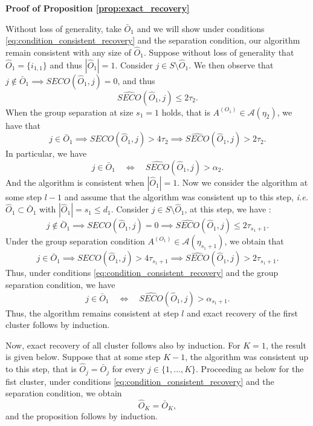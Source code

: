 \documentclass[11pt]{article}
\makeatletter
\renewenvironment{proof}[1][\proofname]{\par
\pushQED{\qed}%
\normalfont \topsep6\p@\@plus6\p@\relax
\trivlist
\item\relax
{\textbf{
#1\@addpunct{ }}}\hspace\labelsep\ignorespaces
}{%
\popQED\endtrivlist\@endpefalse
}
\makeatother
\begin{document}
	\begin{proof}[Proof of Proposition \ref{prop:exact_recovery}]
		Without loss of generality, take $\bar{O}_1$ and we will show under conditions \eqref{eq:condition_consistent_recovery} and the separation condition, our algorithm remain consistent with any size of $\hat{O}_1$. Suppose without loss of generality that $\hat{O}_1 = \{i_{1,1}\}$ and thus $|\hat{O}_1| = 1$. Consider $j \in S \setminus \hat{O}_1$. We then observe that $j \notin \bar{O}_1 \implies SECO(\hat{O}_1,j) = 0$, and thus
		\begin{equation*}
			\widehat{SECO}(\hat{O}_1,j) \leq 2 \tau_2.
		\end{equation*}
		When the group separation at size $s_1 = 1$ holds, that is $A^{(O_1)} \in \mathcal{A}(\eta_2)$, we have that 
		\begin{equation*}
			j \in \bar{O}_1 \implies SECO(\hat{O}_1, j) > 4 \tau_2 \implies \widehat{SECO}(\hat{O}_1,j) > 2 \tau_2.
		\end{equation*}
		In particular, we have
		\begin{equation*}
			j \in \bar{O}_1 \quad \Longleftrightarrow \quad \widehat{SECO}(\hat{O}_1,j) > \alpha_2.
		\end{equation*}
		And the algorithm is consistent when $|\hat{O}_1| = 1$. Now we consider the algorithm at some step $l-1$ and assume that the algorithm was consistent up to this step, \emph{i.e.} $\hat{O}_1 \subset \bar{O}_1$ with $|\hat{O}_1| = s_1 \leq d_1$. Consider $j \in S \setminus \hat{O}_1$, at this step, we have :
		\begin{equation*}
			j \notin \bar{O}_1 \implies SECO(\hat{O}_1,j) = 0 \implies \widehat{SECO}(\hat{O}_1, j) \leq 2 \tau_{s_1+1}.
		\end{equation*}
		Under the group separation condition $A^{(O_1)} \in \mathcal{A}(\eta_{s_1+1})$, we obtain that
		\begin{equation*}
			j \in \bar{O}_1 \implies SECO(\hat{O}_1,j) > 4 \tau_{s_1+1} \implies \widehat{SECO}(\hat{O}_1, j) > 2 \tau_{s_1+1}.
		\end{equation*}
		Thus, under conditions \eqref{eq:condition_consistent_recovery} and the group separation condition, we have
		\begin{equation*}
			j \in \bar{O}_1 \quad \Longleftrightarrow \quad \widehat{SECO}(\hat{O}_1,j) > \alpha_{s_1+1}.
		\end{equation*}
		Thus, the algorithm remains consistent at step $l$ and exact recovery of the first cluster follows by induction.
		
		Now, exact recovery of all cluster follows also by induction. For $K = 1$, the result is given below. Suppose that at some step $K-1$, the algorithm was consistent up to this step, that is $\hat{O}_j = \bar{O}_j$ for every $j \in \{1,\dots,K\}$. Proceeding as below for the fist cluster, under conditions \eqref{eq:condition_consistent_recovery} and the separation condition, we obtain
		\begin{equation*}
			\hat{O}_{K} = \bar{O}_K,
		\end{equation*}
		and the proposition follows by induction.
	\end{proof}
	
\end{document}
